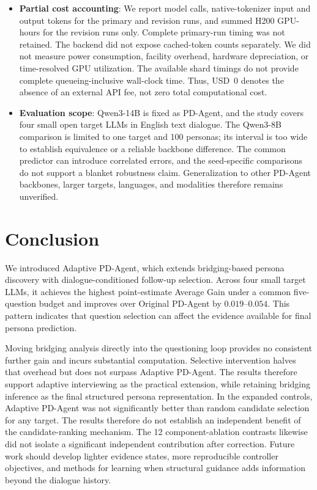 \documentclass{ieeeaccess}
\begin{document}
\begin{itemize}
    \item \textbf{Partial cost accounting}: We report model calls, native-tokenizer input and
    output tokens for the primary and revision runs, and summed H200 GPU-hours for the
    revision runs only. Complete primary-run timing was not retained. The backend did not expose cached-token
    counts separately. We did not measure power consumption, facility overhead, hardware depreciation, or
    time-resolved GPU utilization. The available shard timings do not provide complete
    queueing-inclusive wall-clock time. Thus, USD~0 denotes the absence of an
    external API fee, not zero total computational cost.
    
    \item \textbf{Evaluation scope}: Qwen3-14B is fixed as PD-Agent, and the study covers
    four small open target LLMs in English text dialogue. The Qwen3-8B comparison is limited
    to one target and 100 personas; its interval is too wide to establish equivalence or
    a reliable backbone difference. The common predictor can introduce correlated errors,
    and the seed-specific comparisons do not support a blanket robustness claim. Generalization to other PD-Agent
    backbones, larger targets, languages, and modalities therefore remains unverified.
\end{itemize}

\section{Conclusion}

We introduced Adaptive PD-Agent, which extends bridging-based persona discovery with
dialogue-conditioned follow-up selection. Across four small target LLMs, it achieves the
highest point-estimate Average Gain under a common five-question budget and improves over Original PD-Agent
by $0.019$--$0.054$. This pattern indicates that question selection can affect the evidence
available for final persona prediction.

Moving bridging analysis directly into the questioning loop provides no consistent further
gain and incurs substantial computation. Selective intervention halves that overhead but
does not surpass Adaptive PD-Agent. The results therefore support adaptive interviewing as
the practical extension, while retaining bridging inference as the final structured persona
representation. In the expanded controls, Adaptive PD-Agent was not significantly better than random
candidate selection for any target. The results therefore do not establish an independent
benefit of the candidate-ranking mechanism. The 12 component-ablation contrasts likewise did
not isolate a significant independent contribution after correction. Future work should develop lighter evidence states,
more reproducible controller objectives, and methods for learning when structural guidance adds information
beyond the dialogue history.
\end{document}
